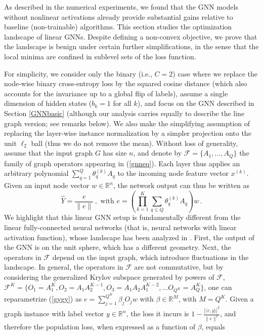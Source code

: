 \documentclass{article} \usepackage{iclr2019_conference,times}
\newcommand{\R}{\mathbb{R}}
\begin{document}
As described in the numerical experiments, 
we found that the GNN models without nonlinear activations already provide substantial gains relative to baseline (non-trainable) algorithms.
This section studies the optimization landscape of linear GNNs. Despite defining a non-convex objective, we prove that the landscape is benign under certain further simplifications, in the sense that the local minima are confined in sublevel sets of the loss function. 

For simplicity, we consider only the binary (i.e., $C=2$) case where we replace the node-wise binary cross-entropy loss by the squared cosine distance (which also accounts for the invariance up to a global flip of labels), assume a single dimension of hidden states ($b_k = 1$ for all $k$), and focus on the GNN described in Section \ref{GNNbasic} (although our analysis carries equally to describe the line graph version; see remarks below). We also make the simplifying assumption of replacing the layer-wise instance normalization by a simpler projection onto the unit $\ell_2$ ball (thus we do not remove the mean). 
Without loss of generality, assume that the input graph $G$ has size $n$, and
denote by $\mathcal{F}=\{A_1, \dots, A_Q\}$ the family of graph operators appearing in (\ref{gnneq}). Each layer thus applies an arbitrary polynomial $\sum_{q=1}^Q \theta_q^{(k)} A_q$ to the incoming node feature vector $x^{(k)}$. Given an input node vector $w \in \R^n$, the network output can thus be written as
\begin{equation}
\label{gygy}
\hat{Y} = \frac{e}{\|e\|}\,,\text{ with } e = \left(\prod_{k =1}^K \sum_{q \leq Q} \theta_q^{(k)} A_q \right) w \,.  
\end{equation}
We highlight that this linear GNN setup is fundamentally different from the linear fully-connected neural networks (that is, neural networks with linear activation function), whose landscape has been analyzed in \cite{kawaguchi2016deep}. First, the output of the GNN is on the unit sphere, which has a different geometry. Next, 
the operators in $\mathcal{F}$ depend on the input graph, which introduce fluctuations in the landscape.
In general, the operators in $\mathcal{F}$ are not commutative, but by considering the generalized Krylov subspace generated by powers of $\mathcal{F}$, $\mathcal{F}^K = \{ O_1=A_1^K, O_2=A_1 A_2^{K-1}, O_3=A_1 A_2 A_1^{K-2}, \dots O_{Q^K}=A_Q^K \}$, one can reparametrize (\ref{gygy}) as $e = \sum_{j=1}^{Q^K} \beta_j O_j w$ with $\beta \in \R^{M}$, with $M=Q^K$. Given a graph instance with label vector $y \in \R^n$, the loss it incurs is $1-\frac{| \langle e, y \rangle |^2}{\| e \|^2}$, and therefore the population loss, when expressed as a function of $\beta$, equals
\end{document}

